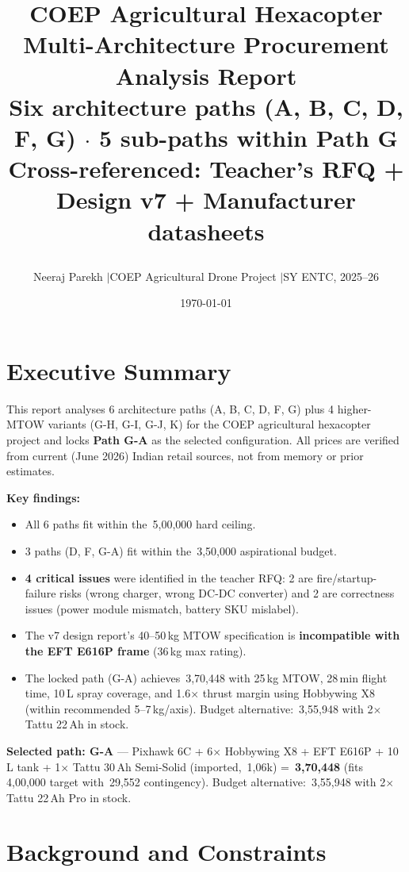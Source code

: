 \documentclass[11pt,a4paper]{article}
\title{\vspace{-0.8cm}%
  \begin{flushleft}%
  {\LARGE \textbf{\textcolor{headerblue}{COEP Agricultural Hexacopter}}}\\[6pt]%
  {\Large \textbf{Multi-Architecture Procurement Analysis Report}}\\[4pt]%
  \normalsize Six architecture paths (A, B, C, D, F, G) $\cdot$ 5 sub-paths within Path G\\
  Cross-referenced: Teacher's RFQ + Design v7 + Manufacturer datasheets
  \end{flushleft}%
}
\author{Neeraj Parekh \quad$\vert$\quad COEP Agricultural Drone Project \quad$\vert$\quad SY ENTC, 2025--26}
\date{\today}
\newcommand{\Rs}{\rupee\,}
\begin{document}
\maketitle
\vspace{-0.8cm}

\section{Executive Summary}

This report analyses 6 architecture paths (A, B, C, D, F, G) plus 4 higher-MTOW variants (G-H, G-I, G-J, K) for the COEP agricultural hexacopter project and locks \textbf{Path G-A} as the selected configuration. All prices are verified from current (June 2026) Indian retail sources, not from memory or prior estimates.

\textbf{Key findings:}
\begin{itemize}
  \item All 6 paths fit within the \Rs{}5,00,000 hard ceiling.
  \item 3 paths (D, F, G-A) fit within the \Rs{}3,50,000 aspirational budget.
  \item \textbf{4 critical issues} were identified in the teacher RFQ: 2 are fire/startup-failure risks (wrong charger, wrong DC-DC converter) and 2 are correctness issues (power module mismatch, battery SKU mislabel).
  \item The v7 design report's 40--50\,kg MTOW specification is \textbf{incompatible with the EFT E616P frame} (36\,kg max rating).
  \item The locked path (G-A) achieves \Rs{}3,70,448 with 25\,kg MTOW, 28\,min flight time, 10\,L spray coverage, and 1.6$\times$ thrust margin using Hobbywing X8 (within recommended 5--7\,kg/axis). Budget alternative: \Rs{}3,55,948 with 2$\times$ Tattu 22\,Ah in stock.
\end{itemize}

\textbf{Selected path: G-A} --- Pixhawk 6C + 6$\times$ Hobbywing X8 + EFT E616P + 10\,L tank + 1$\times$ Tattu 30\,Ah Semi-Solid (imported, \Rs{}1,06k) = \textbf{\Rs{}3,70,448} (fits \Rs{}4,00,000 target with \Rs{}29,552 contingency). Budget alternative: \Rs{}3,55,948 with 2$\times$ Tattu 22\,Ah Pro in stock.

\section{Background and Constraints}
\end{document}

